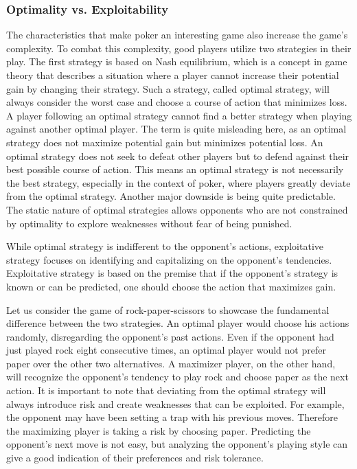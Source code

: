 \subsubsection{Optimality vs. Exploitability}
The characteristics that make poker an interesting game also increase the game's complexity. To combat this complexity, good players utilize two strategies in their play. The first strategy is based on Nash equilibrium, which is a concept in game theory that describes a situation where a player cannot increase their potential gain by changing their strategy. Such a strategy, called optimal strategy, will always consider the worst case and choose a course of action that minimizes loss. A player following an optimal strategy cannot find a better strategy when playing against another optimal player. The term  is quite misleading here, as an optimal strategy does not maximize potential gain but minimizes potential loss. An optimal strategy does not seek to defeat other players but to defend against their best possible course of action. This means an optimal strategy is not necessarily the best strategy, especially in the context of poker, where players greatly deviate from the optimal strategy. Another major downside is being quite predictable. The static nature of optimal strategies allows opponents who are not constrained by optimality to explore weaknesses
without fear of being punished.

While optimal strategy is indifferent to the opponent's actions, exploitative strategy focuses on identifying and capitalizing on the opponent's tendencies. Exploitative strategy is based on the premise that if the opponent's strategy is known or can be predicted, one should choose the action that maximizes gain.

Let us consider the game of rock-paper-scissors to showcase the fundamental difference between the two strategies. An optimal player would choose his actions randomly, disregarding the opponent's past actions. Even if the opponent had just played rock eight consecutive times, an optimal player would not prefer paper over the other two alternatives. A maximizer player, on the other hand, will recognize the opponent's tendency to play rock and choose paper as the next action. It is important to note that deviating from the optimal strategy will always introduce risk and create weaknesses that can be exploited. For example, the opponent may have been setting a trap with his previous moves. Therefore the maximizing player is taking a risk by choosing paper. Predicting the opponent's next move is not easy, but analyzing the opponent's playing style can give a good indication of their preferences and risk tolerance.


